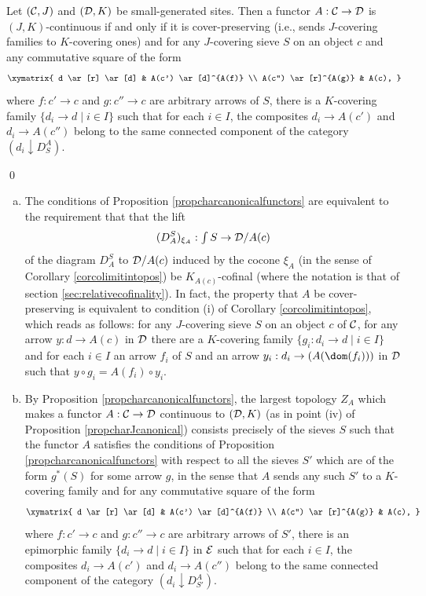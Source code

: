 \documentclass[a4paper,12pt]{article}
\begin{document}
\begin{proposition}\label{propcharcanonicalfunctors}
	Let $({\cal C}, J)$ and $({\cal D}, K)$ be small-generated sites. Then a functor $A:{\cal C}\to {\cal D}$ is $(J, K)$-continuous if and only if it is cover-preserving (i.e., sends $J$-covering families to $K$-covering ones) and for any $J$-covering sieve $S$ on an object $c$ and any commutative square of the form
	\[
	\xymatrix{
		d \ar[r] \ar[d]  & A(c') \ar[d]^{A(f)} \\
		A(c'') \ar[r]^{A(g)} & A(c),
	} 
	\]	
	where $f:c'\to c$ and $g:c''\to c$ are arbitrary arrows of $S$, there is a $K$-covering family $\{d_{i}\to d \mid i\in I\}$ such that for each $i\in I$, the composites $d_{i}\to A(c')$ and $d_{i}\to A(c'')$ belong to the same connected component of the category $(d_{i}\downarrow D^{A}_{S})$.  
\end{proposition}\qed 

\begin{remarks}\label{remcharcanonicalfunctors}
	\begin{enumerate}[(a)]
		\item The conditions of Proposition \ref{propcharcanonicalfunctors} are equivalent to the requirement that that the lift
		\[
		(D^{S}_{A})_{\xi_{A}}:{\textstyle \int S} \to {\cal D}\slash A(c)  
		\]
		of the diagram $D^{S}_{A}$ to ${\cal D}\slash A(c)$ induced by the cocone $\xi_{A}$ (in the sense of Corollary \ref{corcolimitintopos}) be $K_{A(c)}$-cofinal (where the notation is that of section \ref{sec:relativecofinality}). In fact, the property that $A$ be cover-preserving is equivalent to condition (i) of Corollary \ref{corcolimitintopos}, which reads as follows: for any $J$-covering sieve $S$ on an object $c$ of $\cal C$, for any arrow $y:d\to A(c)$ in $\cal D$ there are a $K$-covering family $\{g_i: d_i \to d \mid i\in I\}$ and for each $i\in I$ an arrow $f_{i}$ of $S$ and an arrow $y_i:d_{i}\to (A(\dom(f_i)))$ in $\cal D$ such that $y\circ g_{i}=A(f_{i})\circ y_{i}$.
		
		\item By Proposition \ref{propcharcanonicalfunctors}, the largest topology $Z_{A}$ which makes a functor $A:{\cal C}\to {\cal D}$ continuous to $({\cal D}, K)$ (as in point (iv) of Proposition \ref{propcharJcanonical}) consists precisely of the sieves $S$ such that the functor $A$ satisfies the conditions of Proposition \ref{propcharcanonicalfunctors} with respect to all the sieves $S'$ which are of the form $g^{\ast}(S)$ for some arrow $g$, in the sense that $A$ sends any such $S'$ to a $K$-covering family and for any commutative square of the form
		\[
		\xymatrix{
			d \ar[r] \ar[d]  & A(c') \ar[d]^{A(f)} \\
			A(c'') \ar[r]^{A(g)} & A(c),
		} 
		\]	
		where $f:c'\to c$ and $g:c''\to c$ are arbitrary arrows of $S'$, there is an epimorphic family $\{d_{i}\to d \mid i\in I\}$ in $\cal E$ such that for each $i\in I$, the composites $d_{i}\to A(c')$ and $d_{i}\to A(c'')$ belong to the same connected component of the category $(d_{i}\downarrow D^{A}_{S'})$.   
	\end{enumerate}
	
	
	
\end{remarks}
\end{document}
